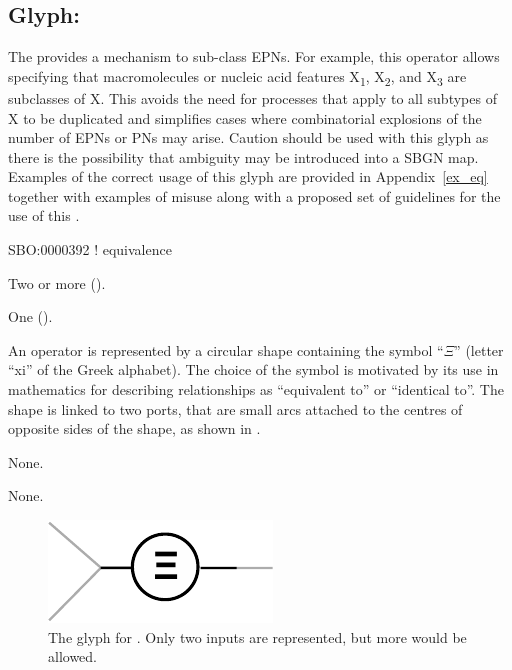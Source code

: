 \subsection{Glyph: }
\label{sec:equivalence}

The  provides a mechanism to sub-class EPNs. For example, this operator allows specifying that macromolecules or nucleic acid features X\textsubscript{1}, X\textsubscript{2}, and X\textsubscript{3} are subclasses of X. This avoids the need for processes that apply to all subtypes of X to be duplicated and simplifies cases where combinatorial explosions of the number of EPNs or PNs may arise. Caution should be used with this glyph as there is the possibility that ambiguity may be introduced into a SBGN map. Examples of the correct usage of this glyph are provided in Appendix~\ref{ex_eq} together with examples of misuse along with a proposed set of guidelines for the use of this .

\begin{glyphDescription}

\glyphSboTerm
SBO:0000392 ! equivalence

\glyphIncoming Two or more  ().

\glyphOutgoing
One  ().

\glyphContainer
An  operator is represented by a circular shape containing the symbol ``$\Xi$'' (letter ``xi'' of the Greek alphabet).
The choice of the symbol is motivated by its use in mathematics for describing relationships as ``equivalent to'' or ``identical to''.
The shape is linked to two ports, that are small arcs attached to the centres of opposite sides of the shape, as shown in .

\glyphLabel
None.

\glyphAux
None.

\end{glyphDescription}

\begin{figure}[H]
  \centering
  \includegraphics{images/build/equivalence.pdf}
  \caption{The \PD glyph for . Only two inputs are represented, but more would be allowed.}
  \label{fig:equivalenceOperator}
\end{figure}

